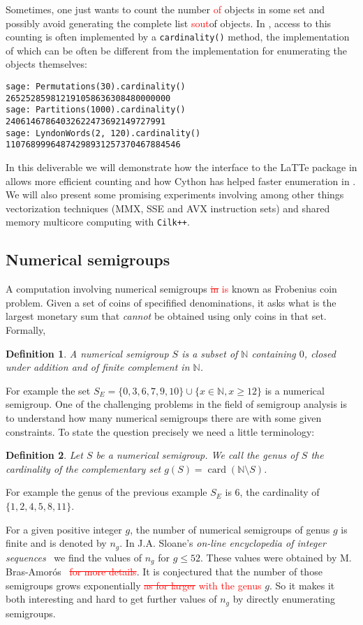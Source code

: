 \documentclass{deliverablereport}
\newcommand{\CilkP}{\texttt{Cilk++}\xspace}
\newcommand{\NN}{\mathbb{N}}
\newtheorem{defi}{Definition}
\begin{document}
Sometimes, one just wants to count the number \textcolor{red}{of} objects in some set and possibly
avoid generating the complete list \textcolor{red}{sout}{of objects}. In \Sage, access to this
counting is often implemented by a {\tt cardinality()} method, the
implementation of which can be often be different from the implementation for
enumerating the objects themselves:
\begin{verbatim}
sage: Permutations(30).cardinality()
265252859812191058636308480000000
sage: Partitions(1000).cardinality()
24061467864032622473692149727991
sage: LyndonWords(2, 120).cardinality()
11076899964874298931257370467884546
\end{verbatim}

In this deliverable we will demonstrate how the interface to the LaTTe package
in \Sage allows more efficient counting and how Cython has helped faster enumeration
in \Sage. We will also present some promising experiments involving among
other things vectorization techniques (MMX, SSE and AVX instruction sets) and
shared memory multicore computing with \CilkP.

\subsection{Numerical semigroups}

A computation involving numerical semigroups \textcolor{red}{\sout{in} is} known as Frobenius coin
problem. Given a set of coins of specifified denominations, it asks what is
the largest monetary sum that {\em cannot} be obtained using only coins in that
set. Formally,
\begin{defi}
  A \emph{numerical semigroup} $S$ is a subset of $\NN$ containing $0$, closed
  under addition and of finite complement in $\NN$.
\end{defi}
For example the set $S_E=\{0,3,6,7,9,10\}\cup\{x\in\NN, x\geq 12\}$
is a numerical semigroup. One of the challenging problems in the field of
semigroup analysis is to understand how many numerical semigroups there are with some
given constraints. To state the question precisely we need a little
terminology:
\begin{defi}
  Let $S$ be a numerical semigroup. We call the \emph{genus} of $S$ the
  cardinality of the complementary set $g(S)=\operatorname{card}(\NN\setminus
  S)$.
\end{defi}
For example the genus of the previous example $S_E$ is $6$, the cardinality of
$\{1,2,4,5,8,11\}$.

For a given positive integer $g$, the number of numerical semigroups of genus
$g$ is finite and is denoted by $n_g$. In J.A. Sloane's \emph{on-line
encyclopedia of integer sequences}~\cite{OEIS} we find the values of $n_g$
for $g\leq 52$. These values were obtained by M. Bras-Amor\'os~\cite{BrasAmoros2008}
\textcolor{red}{\sout{for more details}}. It is conjectured that the number of
those semigroups grows exponentially \textcolor{red}{\sout{as for larger} with the genus} $g$. So it makes it both interesting and hard
to get further values of $n_g$ by directly enumerating semigroups.
\end{document}
